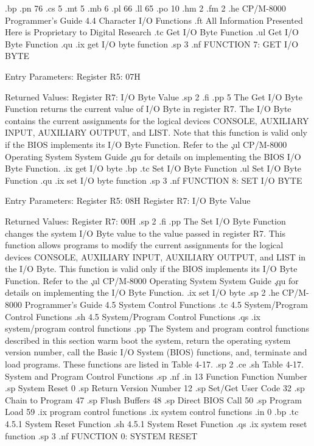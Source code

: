 
.bp
.pn 76
.cs 5
.mt 5
.mb 6
.pl 66
.ll 65
.po 10
.hm 2
.fm 2
.he CP/M-8000 Programmer's Guide          4.4  Character I/O Functions
.ft All Information Presented Here is Proprietary to Digital Research
.tc                Get I/O Byte Function
.ul
Get I/O Byte Function
.qu
.ix get I/O byte function
.sp 3
.nf
                    FUNCTION 7:  GET I/O BYTE

                Entry Parameters:
                   Register   R5:  07H

                Returned  Values:
                   Register   R7:  I/O Byte Value
.sp 2
.fi
.pp 5
The Get I/O Byte Function returns the current value of I/O Byte
in register   R7. The I/O Byte contains the current assignments
for the logical devices CONSOLE, AUXILIARY INPUT, AUXILIARY
OUTPUT, and LIST. Note that this function is valid only if the
BIOS implements its I/O Byte Function.  Refer to the \c
.ul
CP/M-8000 Operating System System Guide \c
.qu
for details on implementing the
BIOS I/O Byte Function. 
.ix get I/O byte
.bp
.tc                Set I/O Byte Function
.ul
Set I/O Byte Function
.qu
.ix set I/O byte function
.sp 3
.nf
                    FUNCTION 8:  SET I/O BYTE

                Entry Parameters:
                   Register   R5:  08H
                   Register   R7:  I/O Byte Value

                Returned  Values:
                   Register   R7:  00H
.sp 2
.fi
.pp
The Set I/O Byte Function changes the system I/O Byte value to
the value passed in register   R7.  This function allows programs
to modify the current assignments for the logical devices
CONSOLE, AUXILIARY INPUT, AUXILIARY OUTPUT, and LIST in the I/O
Byte. This function is valid only if the BIOS
implements its I/O Byte Function.  Refer to the \c
.ul
CP/M-8000 Operating System System Guide \c
.qu
for details on implementing the I/O Byte Function.   
.ix set I/O byte
.sp 2
.he CP/M-8000 Programmer's Guide         4.5  System Control Functions
.tc    4.5  System/Program Control Functions
.sh 
4.5  System/Program Control Functions 
.qs
.ix system/program control functions
.pp 
The System and program control functions described in this 
section warm boot the system, return the operating system version number, call 
the Basic I/O System (BIOS) functions, and, terminate and load programs. 
These functions are listed in Table 4-17.
.sp 2
.ce
.sh
Table 4-17. System and Program Control Functions
.sp 
.nf
.in 13
      Function             Function Number
.sp 
System Reset                      0
.sp
Return Version Number            12
.sp
Set/Get User Code                32
.sp
Chain to Program                 47
.sp
Flush Buffers                    48
.sp
Direct BIOS Call                 50
.sp
Program Load                     59
.ix program control functions
.ix system control functions
.in 0
.bp
.tc         4.5.1  System Reset Function
.sh
4.5.1  System Reset Function
.qs
.ix system reset function
.sp 3
.nf
                    FUNCTION 0:  SYSTEM RESET

